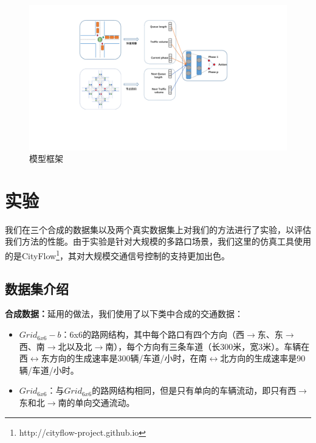 \begin{figure}[htb]
  \includegraphics[width=1.4\textwidth]{fig/model-framework.pdf}
  \caption{模型框架}
  \label{fig:model-framework}
\end{figure}
\section{实验}
我们在三个合成的数据集以及两个真实数据集上对我们的方法进行了实验，以评估我们方法的性能。由于实验是针对大规模的多路口场景，我们这里的仿真工具使用的是CityFlow\footnote{http://cityflow-project.github.io}，其对大规模交通信号控制的支持更加出色。
\subsection{数据集介绍}

\textbf{合成数据：}延用的做法，我们使用了以下类中合成的交通数据：
\begin{itemize}
  \item $Grid_{6x6}-b$：6x6的路网结构，其中每个路口有四个方向（西$\rightarrow$东、东$\rightarrow$西、南$\rightarrow$北以及北$\rightarrow$南），每个方向有三条车道（长300米，宽3米）。车辆在西$\leftrightarrow$东方向的生成速率是300辆/车道/小时，在南$\leftrightarrow$北方向的生成速率是90辆/车道/小时。
  \item $Grid_{6x6}$：与$Grid_{6x6}$的路网结构相同，但是只有单向的车辆流动，即只有西$\rightarrow$东和北$\rightarrow$南的单向交通流动。
\end{itemize}

